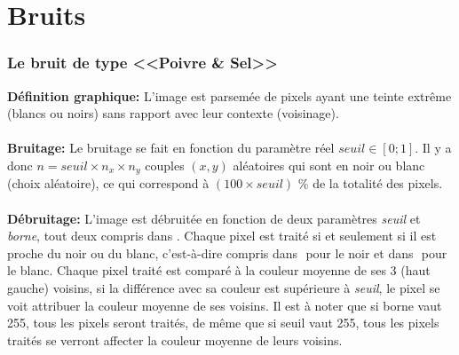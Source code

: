 \documentclass{article}
\begin{document}
	
	
	
	\newpage
	
	
	
	
	
	\part*{Bruits}
	
	
	
	
		\section{Le bruit de type <<Poivre \& Sel>>}
		\textbf{Définition graphique: }L'image est parsemée de pixels ayant une teinte extrême (blancs ou noirs) sans rapport avec leur contexte (voisinage).\\\\
		\textbf{Bruitage: }Le bruitage se fait en fonction du paramètre réel \begin{math}seuil\in[0;1]\end{math}. Il y a donc \begin{math}n = seuil\times n_x\times n_y\end{math} couples \begin{math}(x, y)\end{math} aléatoires qui sont en noir ou blanc (choix aléatoire), ce qui correspond à \begin{math}(100\times seuil)\end{math} \% de la totalité des pixels.\\\\
		\textbf{Débruitage: }L'image est débruitée en fonction de deux paramètres \emph{seuil} et \emph{borne}, tout deux compris dans \begin{math}[0;255]\end{math}. Chaque pixel est traité si et seulement si il est proche du noir ou du blanc, c'est-à-dire compris dans \begin{math}[0;borne]\end{math} pour le noir et dans \begin{math}[255-borne;255]\end{math} pour le blanc. Chaque pixel traité est comparé à la couleur moyenne de ses 3 (haut gauche) voisins, si la différence avec sa couleur est supérieure à \emph{seuil}, le pixel se voit attribuer la couleur moyenne de ses voisins. Il est à noter que si borne vaut 255, tous les pixels seront traités, de même que si seuil vaut 255, tous les pixels traités se verront affecter la couleur moyenne de leurs voisins.\\\\
\end{document}

